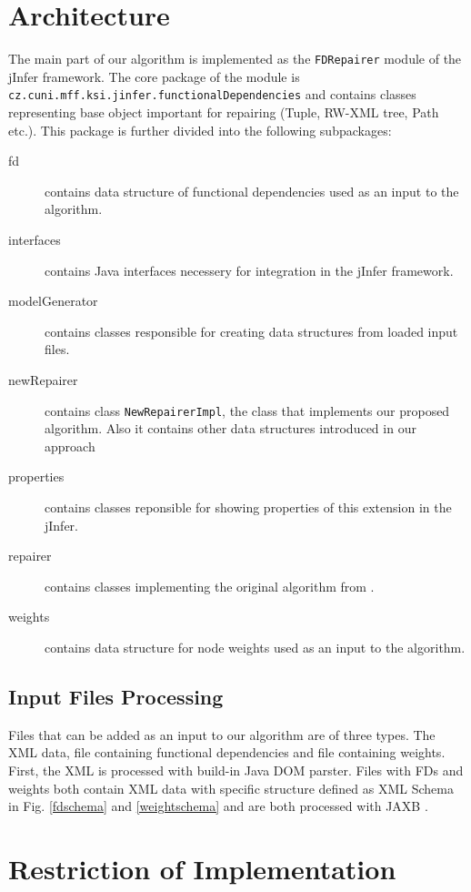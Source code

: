 \section{Architecture}

The main part of our algorithm is implemented as the \texttt{FDRepairer} module of the jInfer framework. The core package of the module is \texttt{cz.cuni.mff.\discretionary{}{}{}ksi.jinfer.functionalDependencies} and contains classes representing base object important for repairing (Tuple, RW-XML tree, Path etc.). This package is further divided into the following subpackages:

\begin{description}
	\item[fd] contains data structure of functional dependencies used as an input to the algorithm.
    \item [interfaces] contains Java interfaces necessery for integration in the jInfer framework.
    \item [modelGenerator] contains classes responsible for creating data structures from loaded input files.
    \item [newRepairer] contains class \texttt{NewRepairerImpl}, the class that implements our proposed algorithm. Also it contains other data structures introduced in our approach
    \item [properties] contains classes reponsible for showing properties of this extension in the jInfer.
    \item [repairer] contains classes implementing the original algorithm from \cite{RepAndConsistentAnswer}.
    \item [weights] contains data structure for node weights used as an input to the algorithm.
\end{description}

\subsection{Input Files Processing}

Files that can be added as an input to our algorithm are of three types. The XML data, file containing functional dependencies and file containing weights. First, the XML is processed with build-in Java DOM parster. Files with FDs and weights both contain XML data with specific structure defined as XML Schema in Fig. \ref{fdschema} and \ref{weightschema} and are both processed with JAXB \cite{JAXB}.


\section{Restriction of Implementation}

